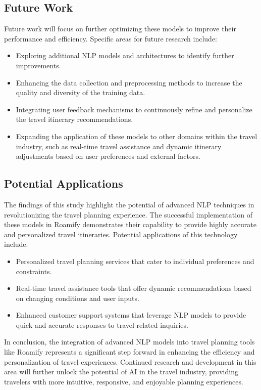 \documentclass[conference]{IEEEtran}
\begin{document}
\subsection{Future Work}

Future work will focus on further optimizing these models to improve their performance and efficiency. Specific areas for future research include:
\begin{itemize}
    \item Exploring additional NLP models and architectures to identify further improvements.
    \item Enhancing the data collection and preprocessing methods to increase the quality and diversity of the training data.
    \item Integrating user feedback mechanisms to continuously refine and personalize the travel itinerary recommendations.
    \item Expanding the application of these models to other domains within the travel industry, such as real-time travel assistance and dynamic itinerary adjustments based on user preferences and external factors.
\end{itemize}

\subsection{Potential Applications}

The findings of this study highlight the potential of advanced NLP techniques in revolutionizing the travel planning experience. The successful implementation of these models in Roamify demonstrates their capability to provide highly accurate and personalized travel itineraries. Potential applications of this technology include:
\begin{itemize}
    \item Personalized travel planning services that cater to individual preferences and constraints.
    \item Real-time travel assistance tools that offer dynamic recommendations based on changing conditions and user inputs.
    \item Enhanced customer support systems that leverage NLP models to provide quick and accurate responses to travel-related inquiries.
\end{itemize}

In conclusion, the integration of advanced NLP models into travel planning tools like Roamify represents a significant step forward in enhancing the efficiency and personalization of travel experiences. Continued research and development in this area will further unlock the potential of AI in the travel industry, providing travelers with more intuitive, responsive, and enjoyable planning experiences.
\end{document}
